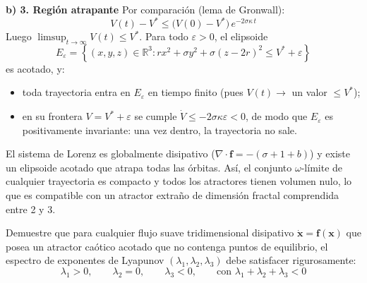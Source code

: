 \documentclass[11pt,a4paper]{article}
\newenvironment{solucion}[1][Solución Detallada]{%
    \vspace{1.5mm}%
    \noindent{\large\textbf{Solución:}}\par\vspace{1.5mm}%
}{%
    \par\vspace{3mm}%
}
\newenvironment{conclusion}[1][Interpretación Dinámica y Conclusión]{%
    \vspace{2mm}%
    \noindent{\large\textbf{Conclusión:}}\par\vspace{1.5mm}%
}{%
    \par\vspace{3mm}%
}
\begin{document}
\begin{solucion}
\vspace{3.5mm}

\textbf{\large b) 3. Región atrapante}
Por comparación (lema de Gronwall):
\[
\boxed{V(t) - V^* \le \bigl(V(0) - V^*\bigr)\, e^{-2\sigma\kappa\, t}}
\]
Luego $\limsup_{t\to\infty} V(t) \le V^*$. Para todo $\varepsilon > 0$, el elipsoide
\[
\boxed{E_\varepsilon = \left\{(x,y,z) \in \mathbb{R}^3 : r x^2 + \sigma y^2 + \sigma (z - 2r)^2 \le V^* + \varepsilon\right\}}
\]
es acotado, y:
\begin{itemize}[leftmargin=2em]
    \item toda trayectoria entra en $E_\varepsilon$ en tiempo finito (pues $V(t) \to$ un valor $\le V^*$);
    \item en su frontera $V = V^* + \varepsilon$ se cumple $\dot V \le -2\sigma\kappa\varepsilon < 0$, de modo que $E_\varepsilon$ es positivamente invariante: una vez dentro, la trayectoria no sale.
\end{itemize}

\end{solucion}

\begin{conclusion}
El sistema de Lorenz es globalmente disipativo ($\nabla\cdot\mathbf{f} = -(\sigma+1+b)$) y existe un elipsoide acotado que atrapa todas las órbitas. Así, el conjunto $\omega$-límite de cualquier trayectoria es compacto y todos los atractores tienen volumen nulo, lo que es compatible con un atractor extraño de dimensión fractal comprendida entre 2 y 3.
\end{conclusion}

\vspace{3mm}

\begin{problema}[Problema 4.5]
Demuestre que para cualquier flujo suave tridimensional disipativo $\dot{\mathbf{x}} = \mathbf{f}(\mathbf{x})$ que posea un atractor caótico acotado que no contenga puntos de equilibrio, el espectro de exponentes de Lyapunov $(\lambda_1, \lambda_2, \lambda_3)$ debe satisfacer rigurosamente:
\[
\lambda_1 > 0, \qquad \lambda_2 = 0, \qquad \lambda_3 < 0, \qquad \text{con } \lambda_1 + \lambda_2 + \lambda_3 < 0
\]
\end{problema}
\end{document}
